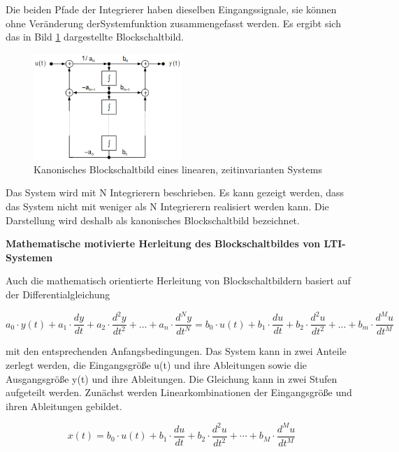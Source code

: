 \noindent Die beiden Pfade der Integrierer haben dieselben Eingangssignale, sie können ohne Veränderung derSystemfunktion zusammengefasst werden. Es ergibt sich das in Bild \ref{fig:KanonischZeitinvarianzBSB} dargestellte Blockschaltbild.

\begin{figure}[H]
  \centerline{\includegraphics[width=0.5\textwidth]{Kapitel2/Bilder/image28}}
  \caption{Kanonisches Blockschaltbild eines linearen, zeitinvarianten Systems}
  \label{fig:KanonischZeitinvarianzBSB}
\end{figure}

\noindent Das System wird mit N Integrierern beschrieben. Es kann gezeigt werden, dass das System nicht mit weniger als N Integrierern realisiert werden kann. Die Darstellung wird deshalb als kanonisches Blockschaltbild bezeichnet.\bigskip

{\selectfont
\noindent\textbf{Mathematische motivierte Herleitung des Blockschaltbildes von LTI-Systemen}}

\noindent Auch die mathematisch orientierte Herleitung von Blockschaltbildern basiert auf der
Differentialgleichung

\begin{equation}\label{eq:threetwohundred}
a_{0}\cdot y(t) + a_{1}\cdot \frac{dy}{dt}+a_{2}\cdot \frac{d^2y}{dt^2}+ ... +a_{n}\cdot \frac{d^Ny}{dt^N}=
b_{0}\cdot u(t) + b_{1}\cdot \frac{du}{dt}+b_{2}\cdot \frac{d^2u}{dt^2}+ ... +b_{m}\cdot \frac{d^Mu}{dt^M}
\end{equation}

\noindent mit den entsprechenden Anfangsbedingungen. Das System kann in zwei Anteile zerlegt werden, die Eingangsgröße u(t) und ihre Ableitungen sowie die Ausgangsgröße y(t) und ihre Ableitungen. Die Gleichung kann in zwei Stufen aufgeteilt werden. Zunächst werden Linearkombinationen der Eingangsgröße und ihren Ableitungen gebildet.

\begin{equation}\label{eq:threetwohundredone}
x(t) = b_{0}\cdot u(t) + b_{1}\cdot \frac{du}{dt} +  b_{2}\cdot \frac{d^2u}{dt^2} + \cdots + b_{M}\cdot \frac{d^Mu}{dt^M}
\end{equation}

